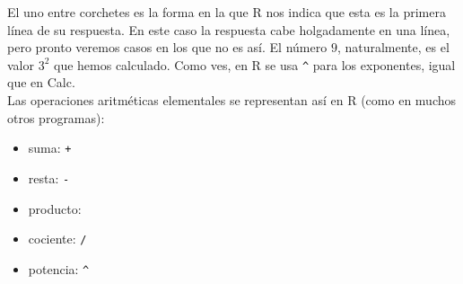 \documentclass[10pt,a4paper]{article}\usepackage[]{graphicx}\usepackage[]{color}
\begin{document}
El uno entre corchetes es la forma en la que R nos indica que esta es la primera línea de su respuesta. En este caso la respuesta cabe holgadamente en una línea, pero pronto veremos casos en los que no es así.  El número $9$, naturalmente, es el valor $3^2$ que hemos calculado. Como ves, en R se usa \verb#^# para los exponentes, igual que en Calc.\\[5mm]

Las {\sf operaciones aritméticas} elementales se representan así en R (como en muchos otros programas):
\begin{itemize}
  \item suma: {\tt +}
  \item resta: {\tt -}
  \item producto: {\tt *}
  \item cociente: {\tt /}
  \item potencia: \verb#^#
\end{itemize}
\end{document}
